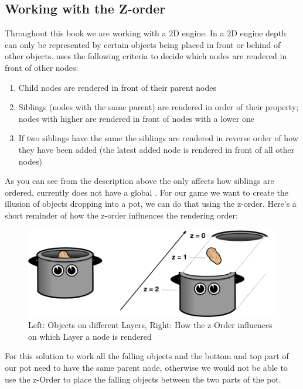 \subsection{Working with the Z-order}\label{z-order-intro}
Throughout this book we are working with a 2D engine. In a 2D engine depth can
only be represented by certain objects being placed in front or behind of other
objects. \cocos{} uses the following criteria to decide which nodes are rendered
in front of other nodes:
\begin{enumerate}
  \item Child nodes are rendered in front of their parent nodes
  \item Siblings (nodes with the same parent) are rendered in order of their
   property; nodes with higher  are
  rendered in front of nodes with a lower one
  \item If two siblings have the same  the siblings are
  rendered in reverse order of how they have been added (the latest added node
  is rendered in front of all other nodes)
\end{enumerate}

As you can see from the description above the  only affects
how siblings are ordered, \cocos{} currently does not have a global
. For our game we want to create the illusion of objects
dropping into a pot, we can do that using the \cocos{} z-order. Here's a short
reminder of how the z-order influences the rendering order:

\begin{figure}[H]
    \centering
    \includegraphics[width=0.9\linewidth]{images/Chapter3/drawing_order.png}
    \caption{Left: Objects on different Layers, Right: How the z-Order
    influences on which Layer a node is rendered}
\end{figure}

For this solution to work all the falling objects and the bottom and top part of
our pot need to have the same parent node, otherwise we would not be able to use
the z-Order to place the falling objects between the two parts of the pot. 

